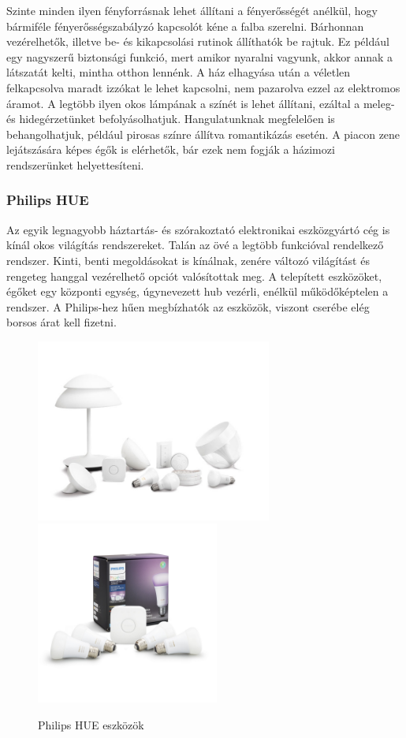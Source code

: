 \documentclass[../main.tex]{subfiles}
\begin{document}
        Szinte minden ilyen fényforrásnak lehet állítani a fényerősségét anélkül, hogy bármiféle fényerősségszabályzó kapcsolót kéne a falba szerelni. Bárhonnan vezérelhetők, illetve be- és kikapcsolási rutinok állíthatók be rajtuk. Ez például egy nagyszerű biztonsági funkció, mert amikor nyaralni vagyunk, akkor annak a látszatát kelti, mintha otthon lennénk. A ház elhagyása után a véletlen felkapcsolva maradt izzókat le lehet kapcsolni, nem pazarolva ezzel az elektromos áramot. A legtöbb ilyen okos lámpának a színét is lehet állítani, ezáltal a meleg- és hidegérzetünket befolyásolhatjuk. Hangulatunknak megfelelően is behangolhatjuk, például pirosas színre állítva romantikázás esetén. A piacon zene lejátszására képes égők is elérhetők, bár ezek nem fogják a házimozi rendszerünket helyettesíteni.\cite{led_lighting4}\cite{led_lighting5}
            
        \subsubsection{Philips HUE}
            Az egyik legnagyobb háztartás- és szórakoztató elektronikai eszközgyártó cég is kínál okos világítás rendszereket. Talán az övé a legtöbb funkcióval rendelkező rendszer. Kinti, benti megoldásokat is kínálnak, zenére változó világítást és rengeteg hanggal vezérelhető opciót valósítottak meg. A telepített eszközöket, égőket egy központi egység, úgynevezett hub vezérli, enélkül működőképtelen a rendszer. A Philips-hez hűen megbízhatók az eszközök, viszont cserébe elég borsos árat kell fizetni.\cite{led_lighting6}
            
            \begin{figure}[h!]
                \centering
                    \includegraphics[height=6cm]{irodalom_res/philips_hue_termekek}
                    \includegraphics[height=6cm]{irodalom_res/philips_hue_termekek_2}
                \caption{Philips HUE eszközök\cite{led_lighting7}\cite{led_lighting8}}
                \label{fig:philips_hue}
             \end{figure}
\end{document}
